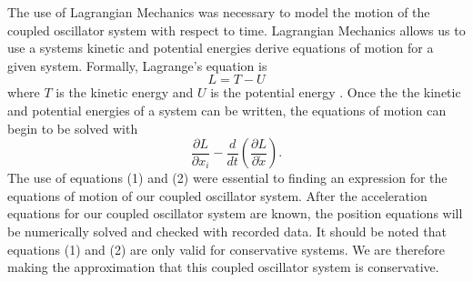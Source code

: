 \documentclass[twocolumn]{article}
\begin{document}
The use of Lagrangian Mechanics was necessary to model the motion of the coupled oscillator system with respect to time. Lagrangian Mechanics allows us to use a systems kinetic and potential energies derive equations of motion for a given system. Formally, Lagrange's equation is
\begin{equation}\label{1}
L=T-U
\end{equation}
where $T$ is the kinetic energy and $U$ is the potential energy \cite{WikiLagrange}. Once the the kinetic and potential energies of a system can be written, the equations of motion can begin to be solved with \cite{WikiLagrange}
\begin{equation}\label{2}
\frac{\partial L}{\partial x_{i}}-\frac{d}{dt}(\frac{\partial L}{\partial \dot{x}}).
\end{equation}
The use of equations (1) and (2) were essential to finding an expression for the equations of motion of our coupled oscillator system. After the acceleration equations for our coupled oscillator system are known, the position equations will be numerically solved and checked with recorded data. It should be noted that equations (1) and (2) are only valid for conservative systems. We are therefore making the approximation that this coupled oscillator system is conservative.
\end{document}
